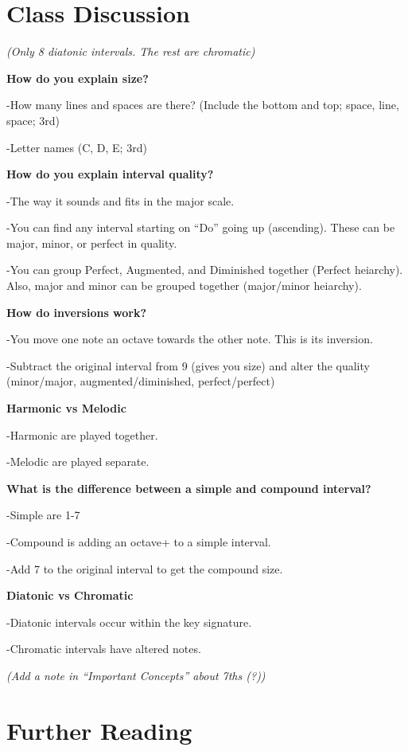 \documentclass{book}
\begin{document}
\hypertarget{class-discussion-49}{%
\section{Class Discussion}\label{class-discussion-49}}

\emph{(Only 8 diatonic intervals. The rest are chromatic)}

\textbf{How do you explain size?}

-How many lines and spaces are there? (Include the bottom and top; space,
line, space; 3rd)

-Letter names (C, D, E; 3rd)

\textbf{How do you explain interval quality?}

-The way it sounds and fits in the major scale.

-You can find any interval starting on ``Do'' going up (ascending). These can
be major, minor, or perfect in quality.

-You can group Perfect, Augmented, and Diminished together (Perfect heiarchy).
Also, major and minor can be grouped together (major/minor heiarchy).

\textbf{How do inversions work?}

-You move one note an octave towards the other note. This is its inversion.

-Subtract the original interval from 9 (gives you size) and alter the quality
(minor/major, augmented/diminished, perfect/perfect)

\textbf{Harmonic vs Melodic}

-Harmonic are played together.

-Melodic are played separate.

\textbf{What is the difference between a simple and compound interval?}

-Simple are 1-7

-Compound is adding an octave+ to a simple interval.

-Add 7 to the original interval to get the compound size.

\textbf{Diatonic vs Chromatic}

-Diatonic intervals occur within the key signature.

-Chromatic intervals have altered notes.

\emph{(Add a note in ``Important Concepts'' about 7ths (?))}

\hypertarget{further-reading-25}{%
\section{Further Reading}\label{further-reading-25}}
\end{document}
